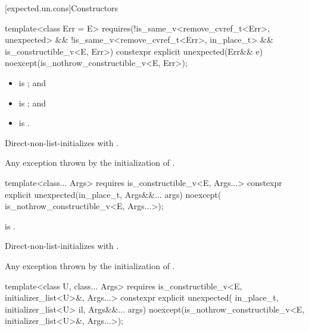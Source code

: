 [expected.un.cons]{Constructors}

%
\begin{itemdecl}
template<class Err = E>
  requires(!is_same_v<remove_cvref_t<Err>, unexpected> &&
           !is_same_v<remove_cvref_t<Err>, in_place_t> && is_constructible_v<E, Err>)
constexpr explicit unexpected(Err&& e) noexcept(is_nothrow_constructible_v<E, Err>);
\end{itemdecl}

\begin{itemdescr}
\pnum
\constraints
\begin{itemize}
\item {} is ; and
\item {} is ; and
\item {} is .
\end{itemize}

\pnum
\effects
Direct-non-list-initializes  with .

\pnum
\throws
Any exception thrown by the initialization of .
\end{itemdescr}

%
\begin{itemdecl}
template<class... Args>
  requires is_constructible_v<E, Args...>
constexpr explicit unexpected(in_place_t, Args&&... args) noexcept(
    is_nothrow_constructible_v<E, Args...>);
\end{itemdecl}

\begin{itemdescr}
\pnum
\constraints
{} is .

\pnum
\effects
Direct-non-list-initializes  with .

\pnum
\throws
Any exception thrown by the initialization of .
\end{itemdescr}

%
\begin{itemdecl}
template<class U, class... Args>
  requires is_constructible_v<E, initializer_list<U>&, Args...>
constexpr explicit unexpected(
    in_place_t, initializer_list<U> il,
    Args&&... args) noexcept(is_nothrow_constructible_v<E, initializer_list<U>&,
                                                        Args...>);
\end{itemdecl}

